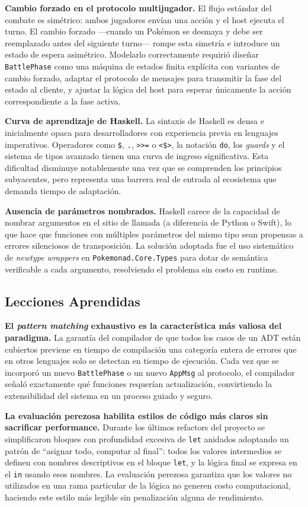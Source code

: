 \textbf{Cambio forzado en el protocolo multijugador.} El flujo estándar del combate es simétrico: ambos jugadores envían una acción y el host ejecuta el turno. El cambio forzado —cuando un Pokémon se desmaya y debe ser reemplazado antes del siguiente turno— rompe esta simetría e introduce un estado de espera asimétrico. Modelarlo correctamente requirió diseñar \texttt{BattlePhase} como una máquina de estados finita explícita con variantes de cambio forzado, adaptar el protocolo de mensajes para transmitir la fase del estado al cliente, y ajustar la lógica del host para esperar únicamente la acción correspondiente a la fase activa.

\textbf{Curva de aprendizaje de Haskell.} La sintaxis de Haskell es densa e inicialmente opaca para desarrolladores con experiencia previa en lenguajes imperativos. Operadores como \texttt{\$}, \texttt{.}, \verb|>>=| o \verb|<$>|, la notación \texttt{do}, los \textit{guards} y el sistema de tipos avanzado tienen una curva de ingreso significativa. Esta dificultad disminuye notablemente una vez que se comprenden los principios subyacentes, pero representa una barrera real de entrada al ecosistema que demanda tiempo de adaptación.

\textbf{Ausencia de parámetros nombrados.} Haskell carece de la capacidad de nombrar argumentos en el sitio de llamada (a diferencia de Python o Swift), lo que hace que funciones con múltiples parámetros del mismo tipo sean propensas a errores silenciosos de transposición. La solución adoptada fue el uso sistemático de \textit{newtype wrappers} en \texttt{Pokemonad.Core.Types} para dotar de semántica verificable a cada argumento, resolviendo el problema sin costo en runtime.

\subsection{Lecciones Aprendidas}

\textbf{El \textit{pattern matching} exhaustivo es la característica más valiosa del paradigma.} La garantía del compilador de que todos los casos de un ADT están cubiertos previene en tiempo de compilación una categoría entera de errores que en otros lenguajes solo se detectan en tiempo de ejecución. Cada vez que se incorporó un nuevo \texttt{BattlePhase} o un nuevo \texttt{AppMsg} al protocolo, el compilador señaló exactamente qué funciones requerían actualización, convirtiendo la extensibilidad del sistema en un proceso guiado y seguro.

\textbf{La evaluación perezosa habilita estilos de código más claros sin sacrificar performance.} Durante los últimos refactors del proyecto se simplificaron bloques con profundidad excesiva de \texttt{let} anidados adoptando un patrón de ``asignar todo, computar al final'': todos los valores intermedios se definen con nombres descriptivos en el bloque \texttt{let}, y la lógica final se expresa en el \texttt{in} usando esos nombres. La evaluación perezosa garantiza que los valores no utilizados en una rama particular de la lógica no generen costo computacional, haciendo este estilo más legible sin penalización alguna de rendimiento.

